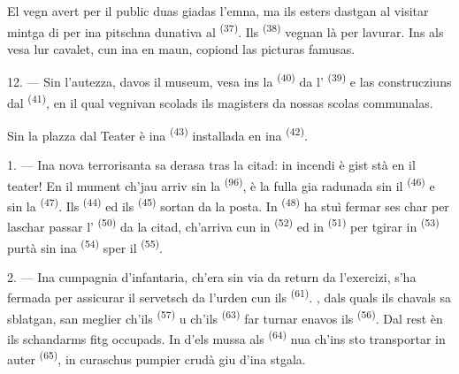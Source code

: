 El vegn avert per il public duas giadas l'emna, ma ils esters dastgan al visitar
mintga di per ina pitschna dunativa al  \textsuperscript{(37)}. Ils
 \textsuperscript{(38)} vegnan là per lavurar. Ins als vesa 
lur cavalet, cun ina  en maun, copiond las picturas famusas.

12. --- Sin l'autezza, davos il museum, vesa ins la  \textsuperscript{(40)}
da l' \textsuperscript{(39)} e las construcziuns dal 
\textsuperscript{(41)}, en il qual vegnivan scolads ils magisters da nossas scolas
communalas.

Sin la plazza dal Teater è ina  \textsuperscript{(43)} installada en ina
 \textsuperscript{(42)}.

\VUsaut{5.0mm}
\VUsaut{3.0mm}

\VUsaut{3.4mm}

1. --- Ina nova terrorisanta sa derasa tras la citad: in incendi è gist stà en il
teater! En il mument ch'jau arriv sin la  \textsuperscript{(96)}, è la fulla
gia radunada sin il  \textsuperscript{(46)} e sin la 
\textsuperscript{(47)}. Ils  \textsuperscript{(44)} ed ils
 \textsuperscript{(45)} sortan da la posta. In  \textsuperscript{(48)} ha stuì fermar ses char per laschar passar l'
\textsuperscript{(50)} da la citad, ch'arriva cun in 
\textsuperscript{(52)} ed in  \textsuperscript{(51)} per tgirar in
 \textsuperscript{(53)} purtà sin ina 
\textsuperscript{(54)} sper il  \textsuperscript{(55)}.

2. --- Ina cumpagnia d'infantaria, ch'era sin via da return da l'exercizi, s'ha
fermada per assicurar il servetsch da l'urden cun ils  \textsuperscript{(61)}. , dals quals ils chavals sa
sblatgan, san meglier ch'ils  \textsuperscript{(57)} u ch'ils
 \textsuperscript{(63)} far turnar enavos ils 
\textsuperscript{(56)}.
Dal rest èn ils schandarms fitg occupads. In d'els mussa als 
\textsuperscript{(64)} nua ch'ins sto transportar in auter 
\textsuperscript{(65)}, in curaschus pumpier crudà giu d'ina stgala.

